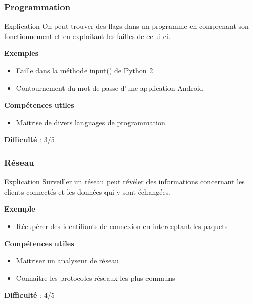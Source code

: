\documentclass{beamer}
\begin{document}

\begin{frame}
\frametitle{Programmation}

\begin{block}{Explication}
    On peut trouver des flags dans un programme en comprenant son fonctionnement et en exploitant les failles de celui-ci.
\end{block}

\pause

\textbf{Exemples}
\begin{itemize}
    \item Faille dans la méthode input() de Python 2
    \item Contournement du mot de passe d'une application Android
\end{itemize}

\pause

\textbf{Compétences utiles}
\begin{itemize}
    \item Maitrise de divers languages de programmation
\end{itemize}

\pause

\textbf{Difficulté} : 3/5

\end{frame}


\begin{frame}
\frametitle{Réseau}

\begin{block}{Explication}
    Surveiller un réseau peut révéler des informations concernant les clients connectés et les données qui y sont échangées.
\end{block}

\pause

\textbf{Exemple}
\begin{itemize}
    \item Récupérer des identifiants de connexion en interceptant les paquets
\end{itemize}

\pause

\textbf{Compétences utiles}
\begin{itemize}
    \item Maitriser un analyseur de réseau
    \item Connaitre les protocoles réseaux les plus communs
\end{itemize}

\pause

\textbf{Difficulté} : 4/5

\end{frame}
\end{document}

